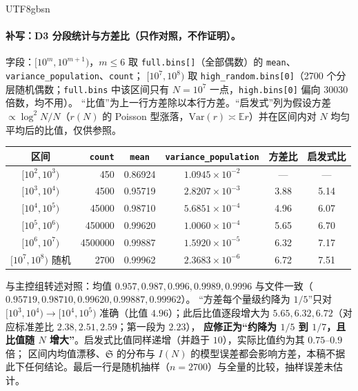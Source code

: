 \documentclass[11pt,a4paper]{article}
\newcommand{\Sing}{\mathfrak S}
\theoremstyle{plain}
\theoremstyle{definition}
\begin{document}
\begin{CJK}{UTF8}{gbsn}
\paragraph{补写：D3 分段统计与方差比（只作对照，不作证明）。}
字段：$[10^m,10^{m+1})$，$m\le6$ 取 \texttt{full.bins[]}（全部偶数）的 \texttt{mean}、\texttt{variance\_population}、\texttt{count}；
$[10^7,10^8)$ 取 \texttt{high\_random.bins[0]}（2700 个分层随机偶数；\texttt{full.bins} 中该区间只有 $N=10^7$ 一点，\texttt{high.bins[0]} 偏向 30030 倍数，均不用）。
“比值”为上一行方差除以本行方差。“启发式”列为假设方差 $\propto\log^2N/N$（$r(N)$ 的 Poisson 型涨落，$\mathrm{Var}(r)\asymp\mathbb E r$）并在区间内对 $N$ 均匀平均后的比值，仅供参照。
\begin{center}
\small
\begin{tabular}{c|r|c|c|c|c}
\hline
区间 & \texttt{count} & \texttt{mean} & \texttt{variance\_population} & 方差比 & 启发式比\\
\hline
$[10^2,10^3)$ & 450 & 0.86924 & $1.0945\times10^{-2}$ & — & —\\
$[10^3,10^4)$ & 4500 & 0.95719 & $2.8207\times10^{-3}$ & 3.88 & 5.14\\
$[10^4,10^5)$ & 45000 & 0.98710 & $5.6851\times10^{-4}$ & 4.96 & 6.07\\
$[10^5,10^6)$ & 450000 & 0.99620 & $1.0060\times10^{-4}$ & 5.65 & 6.70\\
$[10^6,10^7)$ & 4500000 & 0.99887 & $1.5920\times10^{-5}$ & 6.32 & 7.17\\
$[10^7,10^8)$ 随机 & 2700 & 0.99962 & $2.3683\times10^{-6}$ & 6.72 & 7.51\\
\hline
\end{tabular}
\end{center}
与主控组转述对照：均值 $0.957,0.987,0.996,0.9989,0.9996$ 与文件一致（$0.95719,0.98710,0.99620,0.99887,0.99962$）。
“方差每个量级约降为 $1/5$”只对 $[10^3,10^4)\to[10^4,10^5)$ 准确（比值 $4.96$）；此后比值逐段增大为 $5.65,6.32,6.72$（对应标准差比 $2.38,2.51,2.59$；第一段为 $2.23$），
\textbf{应修正为“约降为 $1/5$ 到 $1/7$，且比值随 $N$ 增大”}。启发式比值同样递增（并趋于 $10$），实际比值约为其 $0.75$--$0.9$ 倍；
区间内均值漂移、$\Sing$ 的分布与 $I(N)$ 的模型误差都会影响方差，本稿不据此下任何结论。最后一行是随机抽样（$n=2700$）与全量的比较，抽样误差未估计。


\end{CJK}
\end{document}
